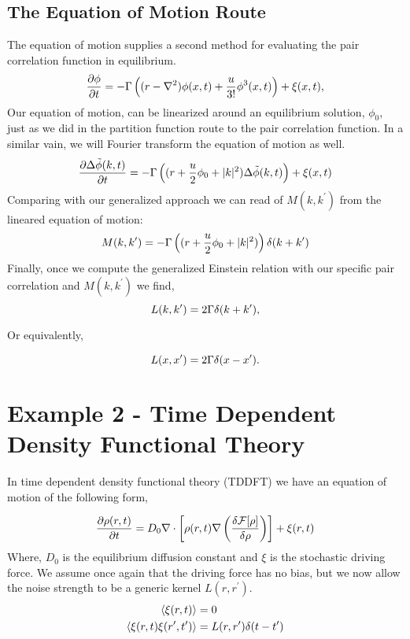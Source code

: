 \subsection{The Equation of Motion Route} %

The equation of motion supplies a second method for evaluating the pair
correlation function in equilibrium.
%
\begin{equation} \frac{\partial \phi}{\partial t} =
-\Gamma\left((r-\nabla^2)\phi(x,t) + \frac{u}{3!}\phi^3(x,t)\right) + \xi(x, t),
\end{equation}
%
Our equation of motion, can be linearized around an equilibrium solution,
$\phi_0$, just as we did in the partition function route to the pair
correlation function. In a similar vain, we will Fourier transform the equation
of motion as well.
%
\begin{equation} \frac{\partial \Delta\tilde{\phi}(k, t)}{\partial t} = -\Gamma\left((r +
\frac{u}{2}\phi_0 + \vert k \vert^2)\Delta\tilde{\phi}(k,t)\right) + \xi(x,t)
\end{equation}
%
Comparing with our generalized approach we can read of $M(k, k^\prime)$ from
the lineared equation of motion:
%
\begin{equation} M(k, k^\prime) = -\Gamma\left((r + \frac{u}{2}\phi_0 + \vert k
\vert^2)\right)\delta(k + k^\prime) \end{equation}
%
Finally, once we compute the generalized Einstein relation with our specific
pair correlation and $M(k, k^\prime)$ we find,
%
\begin{equation} L(k, k^\prime) = 2\Gamma \delta(k + k^\prime), \end{equation}

Or equivalently,

\begin{equation} L(x, x^\prime) = 2\Gamma \delta(x - x^\prime).  \end{equation}

\section{Example 2 - Time Dependent Density Functional Theory}

In time dependent density functional theory (TDDFT) we have an equation of
motion of the following form,

\begin{equation} \frac{\partial \rho(r, t)}{\partial t} = D_0 \nabla \cdot
\left[\rho(r,t)\nabla \left(\frac{\delta \mathcal{F}[\rho]}{\delta \rho}\right)\right] + \xi(r, t) \end{equation}
%
Where, $D_0$ is the equilibrium diffusion constant and $\xi$ is the stochastic
driving force. We assume once again that the driving force has no bias, but we
now allow the noise strength to be a generic kernel $L(r, r^\prime)$.
%
\begin{align} \langle \xi(r,t) \rangle &= 0 \\ \left\langle \xi(r, t)
\xi(r^\prime, t^\prime) \right\rangle &= L(r, r^\prime) \delta (t -t^\prime)
\end{align}
%
